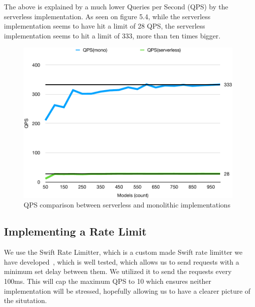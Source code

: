 The above is explained by a much lower Queries per Second (QPS) by the serverless implementation. As seen on figure 5.4, while the serverless implementation seems to have hit a limit of 28 QPS, the serverless implementation seems to hit a limit of 333, more than ten times bigger.
\begin{figure}[h!]
    \centering
    \includegraphics[width=\textwidth]{media/no_rl_qps.pdf}
    \caption{QPS comparison between serverless and monolithic implementations}
    \label{fig:rate_unlimited_comparison_qps}
\end{figure}


\subsection{Implementing a Rate Limit}
We use the Swift Rate Limitter, which is a custom made Swift rate limitter we have developed~\cite{swift-rl}, which is well tested, which allows us to send requests with a minimum set delay between them. We utilized it to send the requests every 100ms. This will cap the maximum QPS to 10 which ensures neither implementation will be stressed, hopefully allowing us to have a clearer picture of the situtation.

